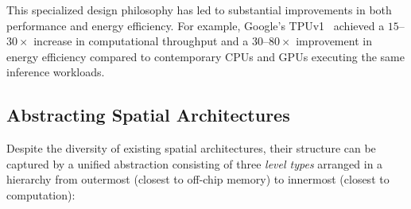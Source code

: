 This specialized design philosophy has led to substantial improvements
in both performance and energy efficiency.
For example, Google's TPUv1~\cite{tpuv1} achieved a
$15$--$30\times$ increase in computational throughput and a
$30$--$80\times$ improvement in energy efficiency compared to
contemporary CPUs and GPUs executing the same inference workloads.


\subsection{Abstracting Spatial Architectures}
\label{sec:sa-abstraction}

Despite the diversity of existing spatial architectures, their structure
can be captured by a unified abstraction consisting of three
\emph{level types} arranged in a hierarchy from outermost (closest to
off-chip memory) to innermost (closest to computation):

